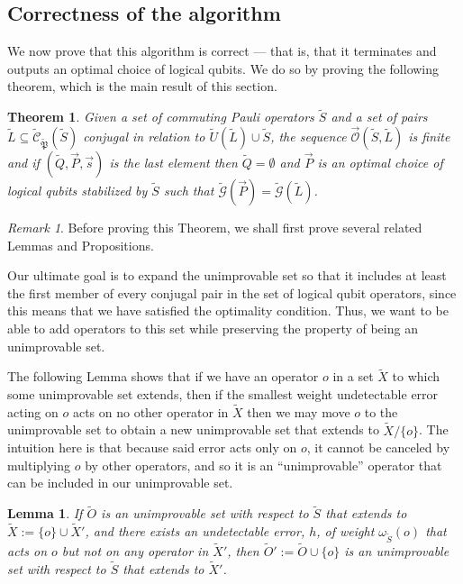 \documentclass[12pt]{amsbook}
\theoremstyle{plain}
\newtheorem{theorem}{Theorem}
\newtheorem{lemma}{Lemma}
\theoremstyle{definition}
\theoremstyle{remark}
\newtheorem{remark}{Remark}
\newcommand{\lst}{\vec}
\newcommand{\set}{\tilde}
\newcommand{\genfun}{\tilde{\mathcal{G}}}
\newcommand{\pauligroup}{{\set{\mathfrak{P}}}}
\newcommand{\centralizer}{\set{\mathcal{C}}}
\newcommand{\optimizer}{\lst{\mathcal{O}}}
\newcommand{\om}{\omega}
\begin{document}
\subsection{Correctness of the algorithm}

We now prove that this algorithm is correct --- that is, that it terminates and outputs an optimal choice of logical qubits.  We do so by proving the following theorem, which is the main result of this section.

\begin{theorem}
\label{theorem:algorithm is correct}
Given a set of commuting Pauli operators $\set S$ and a set of pairs $\set L\subseteq\centralizer_\pauligroup(\set S)$ conjugal in relation to $\set U(\set L)\cup\set S$, the sequence $\optimizer(\set S,\set L)$ is finite and if $(\set Q,\lst P,\lst s)$ is the last element then $\set Q=\emptyset$ and $\lst P$ is an optimal choice of logical qubits stabilized by $\set S$ such that $\genfun(\lst P)=\genfun(\set L)$.
\end{theorem}
\begin{remark}
Before proving this Theorem, we shall first prove several related Lemmas and Propositions.

Our ultimate goal is to expand the unimprovable set so that it includes at least the first member of every conjugal pair in the set of logical qubit operators, since this means that we have satisfied the optimality condition.  Thus, we want to be able to add operators to this set while preserving the property of being an unimprovable set.

The following Lemma shows that if we have an operator $o$ in a set $\set X$ to which some unimprovable set extends, then if the smallest weight undetectable error acting on $o$ acts on no other operator in $\set X$ then we may move $o$ to the unimprovable set to obtain a new unimprovable set that extends to $\set X\slash \{o\}$.  The intuition here is that because said error acts only on $o$, it cannot be canceled by multiplying $o$ by other operators, and so it is an ``unimprovable'' operator that can be included in our unimprovable set.
\end{remark}

\begin{lemma}
\label{lemma:move-it-over}
If $\set O$ is an unimprovable set with respect to $\set S$ that extends to $\set X:=\{o\}\cup\set X'$, and there exists an undetectable error, $h$, of weight $\om_{\set S}(o)$ that acts on $o$ but not on any operator in $\set X'$, then $\set O':=\set O\cup\{o\}$ is an unimprovable set with respect to $\set S$ that extends to $\set X'$.
\end{lemma}
\end{document}
